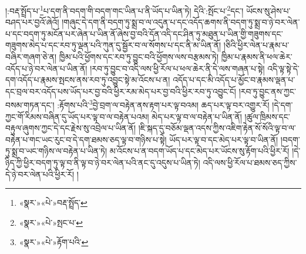 །:བརྡ་སྤྲོད་པ་\footnote{«སྣར་»«པེ་»བརྡ་སྤྲོད་}པ་དག་ནི་བདག་གི་བདག་གང་ཡིན་པ་ནི་ཡོད་པ་ཡིན་ཏེ། དེའི་:སྤོང་པ་\footnote{«སྣར་»«པེ་»སྤང་པ་}དང་། ཡོངས་སུ་ཤེས་པ་བཤད་པར་བྱའོ་ཞེའོ། །གཞུང་དེ་དག་ནི་བདག་ཏུ་སྨྲ་བ་ལ་འདུན་པ་དང་འདོད་ཆགས་ནི་བདག་ཏུ་སྨྲ་བ་ཉེ་བར་ལེན་པ་དང་བདག་ཏུ་མངོན་པར་ཞེན་པ་ཡིན་ནོ་ཞེས་བྱ་བའི་དོན་འདི་དང་ཤིན་ཏུ་མཐུན་པ་ཡིན་གྱི་གཟུགས་དང་གཟུགས་མེད་པ་དང་རབ་ཏུ་ལྡན་པའི་ཀུན་དུ་སྦྱོར་བ་ལ་སོགས་པ་དང་ནི་མ་ཡིན་ནོ། །ཅིའི་ཕྱིར་ལེན་པ་རྣམ་པ་བཞིར་གཞག་ཅེ་ན། ཁྱིམ་པའི་ཕྱོགས་དང་རབ་ཏུ་བྱུང་བའི་ཕྱོགས་ལས་བརྩམས་ཏེ། ཁྱིམ་པ་རྣམས་ནི་ཕལ་ཆེར་འདོད་པ་ཉེ་བར་ལེན་པ་ཡིན་ནོ། །རབ་ཏུ་བྱུང་བ་འདི་ལས་ཕྱི་རོལ་པ་ཕལ་ཆེར་ནི་དེ་ལས་གཞན་པ་སྟེ། འདི་ལྟ་སྟེ་དེ་དག་འདོད་པ་རྣམས་སྤངས་ནས་རབ་ཏུ་འབྱུང་སྟེ་མ་འོངས་པ་ན། འདོད་པ་དང་མི་འདོད་པ་མྱོང་བ་རྣམས་ལྡན་པ་དང་བྲལ་བར་འདོད་པས་ཡོད་པར་བྱ་བའི་ཕྱིར་རམ་མེད་པར་བྱ་བའི་ཕྱིར་རབ་ཏུ་འབྱུང་ངོ། །རབ་ཏུ་བྱུང་ནས་ཀྱང་བསམ་གཏན་དང་། :རྟོགས་པའི་\footnote{«སྣར་»«པེ་»རྟོག་པའི་}བྱེ་བྲག་ལ་བརྟེན་ནས་རྟག་པར་ལྟ་བའམ། ཆད་པར་ལྟ་བར་འགྱུར་རོ། །དེ་དག་ཀྱང་གོ་རིམས་བཞིན་དུ་ཡོད་པར་ལྟ་བ་ལ་བརྟེན་པའམ། མེད་པར་ལྟ་བ་ལ་བརྟེན་པ་ཡིན་ནོ། །ཚུལ་ཁྲིམས་དང་བརྟུལ་ཞུགས་ཀྱང་དེ་དང་རྗེས་སུ་འབྲེལ་པ་ཡིན་ནོ། །ཇི་སྐད་དུ་བཅོམ་ལྡན་འདས་ཀྱིས་འཇིག་རྟེན་སོ་སོའི་ལྟ་བ་ལ་བརྟེན་པ་གང་ཡང་རུང་བ་དེ་དག་ཐམས་ཅད་ལྟ་བ་གཉིས་པ་སྟེ། ཡོད་པར་ལྟ་བ་དང་མེད་པར་ལྟ་བ་ཡིན་ནོ། །བདག་ཏུ་སྨྲ་བ་ཡང་གཉིས་ལ་བརྟེན་པ་ཡིན་ཏེ། མ་འོངས་པ་ན་བདག་ཡོད་པ་དང་མེད་པར་ཡོངས་སུ་རྟོག་པའི་ཕྱིར་རོ། །དེ་ཉིད་ཀྱི་ཕྱིར་བདག་ཏུ་ལྟ་བ་ནི་ལྟ་བ་ཉེ་བར་ལེན་པའི་ནང་དུ་འདུས་པ་ཡིན་ཏེ། འདི་ལས་ཕྱི་རོལ་པ་ཐམས་ཅད་ཀྱིས་དེ་ཉེ་བར་ལེན་པའི་ཕྱིར་རོ། །
